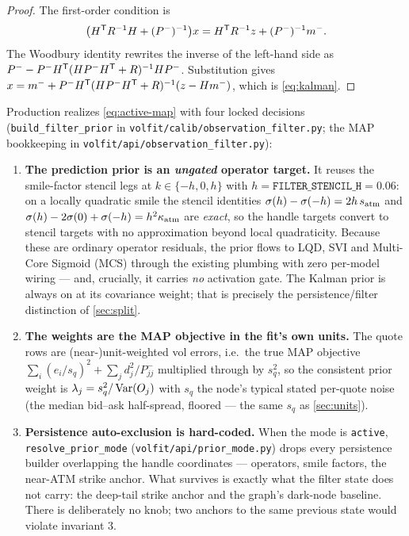 \documentclass[11pt]{article}
\begin{document}
\begin{proof}
The first-order condition is
\[
\big(H^{\mathsf{T}} R^{-1}H+(P^-)^{-1}\big)x
=H^{\mathsf{T}} R^{-1}z+(P^-)^{-1}m^- .
\]
The Woodbury identity rewrites the inverse of the left-hand side as
$P^- - P^-H^{\mathsf{T}}(HP^-H^{\mathsf{T}}+R)^{-1}HP^-$. Substitution gives
$x=m^-+P^-H^{\mathsf{T}}(HP^-H^{\mathsf{T}}+R)^{-1}(z-Hm^-)$, which is \cref{eq:kalman}.
\end{proof}

Production realizes \cref{eq:active-map} with four locked decisions
(\texttt{build\_filter\_prior} in
\texttt{volfit/calib/observation\_filter.py}; the MAP bookkeeping in
\texttt{volfit/api/observation\_filter.py}):

\begin{enumerate}[leftmargin=1.6em]
\item \textbf{The prediction prior is an \emph{ungated} operator target.} It
reuses the smile-factor stencil legs at $k\in\{-h,0,h\}$ with
$h=\texttt{FILTER\_STENCIL\_H}=0.06$: on a locally quadratic smile the stencil
identities
$\sigma(h)-\sigma(-h)=2h\,s_{\mathrm{atm}}$ and
$\sigma(h)-2\sigma(0)+\sigma(-h)=h^2\kappa_{\mathrm{atm}}$
are \emph{exact}, so the handle targets convert to stencil targets with no
approximation beyond local quadraticity. Because these are ordinary operator
residuals, the prior flows to LQD, SVI and Multi-Core Sigmoid (MCS) through
the existing plumbing with zero per-model wiring --- and, crucially, it
carries \emph{no} activation gate. The Kalman prior is always on at its covariance weight; that
is precisely the persistence/filter distinction of \cref{sec:split}.
\item \textbf{The weights are the MAP objective in the fit's own units.} The
quote rows are (near-)unit-weighted vol errors, i.e.\ the true MAP objective
$\sum_i(e_i/s_q)^2+\sum_j d_j^2/P^-_{jj}$ multiplied through by $s_q^2$, so
the consistent prior weight is $\lambda_j=s_q^2/\operatorname{Var}(O_j)$ with $s_q$ the
node's typical stated per-quote noise (the median bid--ask half-spread,
floored --- the same $s_q$ as \cref{sec:units}).
\item \textbf{Persistence auto-exclusion is hard-coded.} When the mode is
\texttt{active}, \texttt{resolve\_prior\_mode}
(\texttt{volfit/api/prior\_mode.py}) drops every persistence builder
overlapping the handle coordinates --- operators, smile factors, the near-ATM
strike anchor. What survives is exactly what the filter state does not carry:
the deep-tail strike anchor and the graph's dark-node baseline. There is
deliberately no knob; two anchors to the same previous state would violate
invariant 3.

\end{enumerate}
\end{document}

